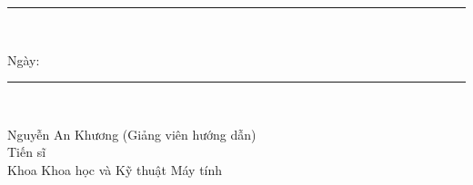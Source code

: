 \cleardoublepage
{}

\vspace*{\fill}

\noindent
\begin{minipage}[t]{0.6\textwidth}
\centering
\rule{\linewidth}{0.4pt}\\[0.3em]
\end{minipage}
\hfill
\begin{minipage}[t]{0.45\textwidth}
\centering
Ngày: \rule{0.6\linewidth}{0.4pt}\\[0.3em]
\end{minipage}

\vspace{0.5em}

\noindent
Nguyễn An Khương (Giảng viên hướng dẫn)\\
Tiến sĩ\\
Khoa Khoa học và Kỹ thuật Máy tính
